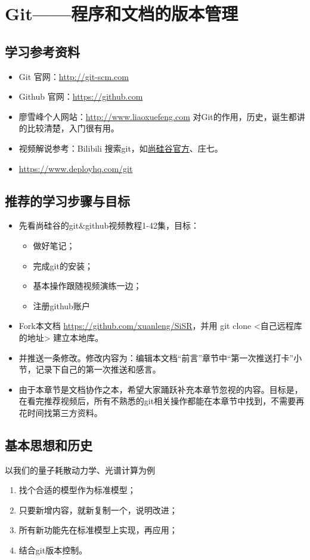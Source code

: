 \chapter{Git——程序和文档的版本管理}
\section{学习参考资料}
\begin{itemize}
\item Git 官网：\url{http://git-scm.com}

\item Github 官网：\url{https://github.com}

\item 廖雪峰个人网站：\url{http://www.liaoxuefeng.com} 对Git的作用，历史，诞生都讲的比较清楚，入门很有用。

\item 视频解说参考：Bilibili 搜索git，如\href{https://www.bilibili.com/video/BV1pW411A7a5?from=search&seid=3815767452396308043}{尚硅谷官方}、庄七。

\item \url{https://www.deployhq.com/git}
\end{itemize}


\section{推荐的学习步骤与目标}
\begin{itemize}
\item 先看尚硅谷的git\&github视频教程1-42集，目标：
	\begin{itemize}
	\item 做好笔记；
	\item 完成git的安装；
	\item 基本操作跟随视频演练一边；
	\item 注册github账户
 	\end{itemize}
\item Fork本文档 \url{https://github.com/xuanleng/SiSR}，并用 git clone <自己远程库的地址> 建立本地库。
\item 并推送一条修改。修改内容为：编辑本文档“前言”章节中“第一次推送打卡”小节，记录下自己的第一次推送和感言。
\item 由于本章节是文档协作之本，希望大家踊跃补充本章节忽视的内容。目标是，在看完推荐视频后，所有不熟悉的git相关操作都能在本章节中找到，不需要再花时间找第三方资料。
\end{itemize}


\section{基本思想和历史}
以我们的量子耗散动力学、光谱计算为例
\begin{enumerate}
\item 找个合适的模型作为标准模型；
\item 只要新增内容，就新复制一个，说明改进；
\item 所有新功能先在标准模型上实现，再应用；
\item 结合git版本控制。
\end{enumerate}


